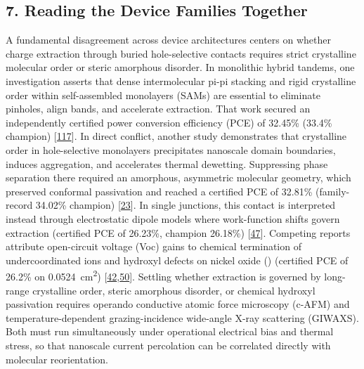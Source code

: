\documentclass[
  11pt,
]{article}
\begin{document}
\subsection{7. Reading the Device Families
Together}\label{reading-the-device-families-together}

A fundamental disagreement across device architectures centers on
whether charge extraction through buried hole-selective contacts
requires strict crystalline molecular order or steric amorphous
disorder. In monolithic hybrid tandems, one investigation asserts that
dense intermolecular pi-pi stacking and rigid crystalline order within
self-assembled monolayers (SAMs) are essential to eliminate pinholes,
align bands, and accelerate extraction. That work secured an
independently certified power conversion efficiency (PCE) of 32.45\%
(33.4\% champion)
{[}\href{https://doi.org/10.1038/s41467-026-72160-x}{117}{]}. In direct
conflict, another study demonstrates that crystalline order in
hole-selective monolayers precipitates nanoscale domain boundaries,
induces aggregation, and accelerates thermal dewetting. Suppressing
phase separation there required an amorphous, asymmetric molecular
geometry, which preserved conformal passivation and reached a certified
PCE of 32.81\% (family-record 34.02\% champion)
{[}\href{https://doi.org/10.1002/adma.73106}{23}{]}. In single
junctions, this contact is interpreted instead through electrostatic
dipole models where work-function shifts govern extraction (certified
PCE of 26.23\%, champion 26.18\%)
{[}\href{https://doi.org/10.1038/s41467-026-69198-2}{47}{]}. Competing
reports attribute open-circuit voltage (Voc) gains to chemical
termination of undercoordinated ions and hydroxyl defects on nickel
oxide () (certified PCE of 26.2\% on
\qty{0.0524}{\centi\meter\squared})
{[}\href{https://doi.org/10.1002/adma.73656}{42},\href{https://doi.org/10.1002/adma.73382}{50}{]}.
Settling whether extraction is governed by long-range crystalline order,
steric amorphous disorder, or chemical hydroxyl passivation requires
operando conductive atomic force microscopy (c-AFM) and
temperature-dependent grazing-incidence wide-angle X-ray scattering
(GIWAXS). Both must run simultaneously under operational electrical bias
and thermal stress, so that nanoscale current percolation can be
correlated directly with molecular reorientation.
\end{document}
